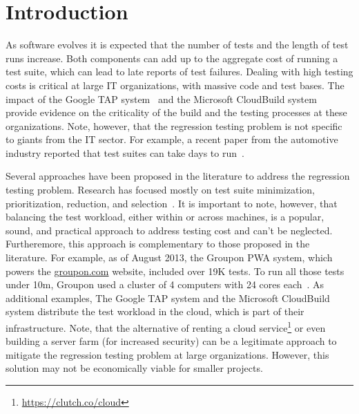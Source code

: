 \section{Introduction}


As software evolves it is expected that the number of tests and the
length of test runs increase.  Both components can add up to the
aggregate cost of running a test suite, which can lead to late reports
of test failures.  Dealing with high testing costs is critical at
large IT organizations, with massive code and test bases.  The impact
of the Google TAP system~\cite{google-tap,google-ci} and the Microsoft
CloudBuild system~\cite{prasad-shulte-ieee-microsoft-ci} provide
evidence on the criticality of the build and the testing processes at
these organizations.  Note, however, that the regression testing
problem is not specific to giants from the IT sector.  For example, a
recent paper from the automotive industry reported that test suites
can take days to run~\cite{artl-etal-icst2015}.

Several approaches have been proposed in the literature to address the
regression testing problem.  Research has focused mostly on test suite
minimization, prioritization, reduction, and
selection~\cite{yoo-harman-stvr2012}.  It is important to note,
however, that balancing the test workload, either within or across
machines, is a popular, sound, and practical approach to address
testing cost and can't be neglected.  Furtheremore, this approach is
complementary to those proposed in the literature. For example, as of
August 2013, the Groupon PWA system, which powers the
\url{groupon.com} website, included over 19K tests.  To run all those
tests under 10m, Groupon used a cluster of 4 computers with 24 cores
each~\cite{kim-etal-fse2013}.  As additional examples, The Google TAP
system and the Microsoft CloudBuild system distribute the test
workload in the cloud, which is part of their infrastructure.  Note,
that the alternative of renting a cloud
service\footnote{\url{https://clutch.co/cloud}} or even building a
server farm (for increased security) can be a legitimate approach to
mitigate the regression testing problem at large organizations.
However, this solution may not be economically viable for smaller
projects.


